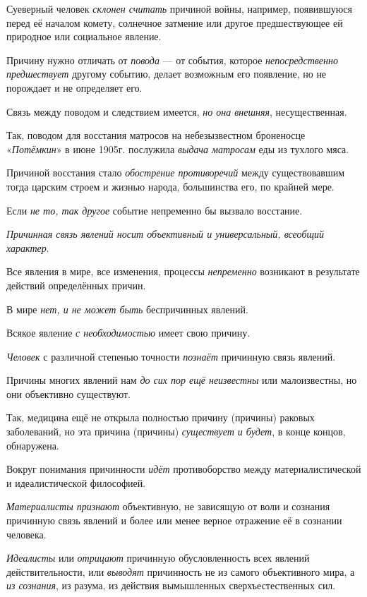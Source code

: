 \documentclass[a4paper,14pt,russian]{extreport}
\begin{document}
Суеверный человек \emph{склонен считать} причиной войны, например, появившуюся перед её началом комету, солнечное затмение или другое предшествующее ей природное или социальное явление.

Причину нужно отличать от \emph{повода} --- от события, которое \emph{непосредственно предшествует} другому событию, делает возможным его появление, но не порождает и не определяет его.

Связь между поводом и следствием имеется, \emph{но она внешняя}, несущественная.

Так, поводом для восстания матросов на небезызвестном броненосце «\emph{Потёмкин}» в июне 1905г. послужила \emph{выдача матросам} еды из тухлого мяса.

Причиной восстания стало \emph{обострение противоречий} между существовавшим тогда царским строем и жизнью народа, большинства его, по крайней мере.

Если \emph{не то, так другое} событие непременно бы вызвало восстание.

\emph{Причинная связь явлений носит объективный и универсальный, всеобщий характер}.

Все явления в мире, все изменения, процессы \emph{непременно} возникают в результате действий определённых причин.

В мире \emph{нет, и не может быть} беспричинных явлений.

Всякое явление \emph{с необходимостью} имеет свою причину.

\emph{Человек} с различной степенью точности \emph{познаёт} причинную связь явлений.

Причины многих явлений нам \emph{до сих пор ещё неизвестны} или малоизвестны, но они объективно существуют.

Так, медицина ещё не открыла полностью причину (причины) раковых заболеваний, но эта причина (причины) \emph{существует и будет}, в конце концов, обнаружена.

Вокруг понимания причинности \emph{идёт} противоборство между материалистической и идеалистической философией.

\emph{Материалисты признают} объективную, не зависящую от воли и сознания причинную связь явлений и более или менее верное отражение её в сознании человека.

\emph{Идеалисты} или \emph{отрицают} причинную обусловленность всех явлений действительности, или \emph{выводят} причинность не из самого объективного мира, а \emph{из сознания}, из разума, из действия вымышленных сверхъестественных сил.
\end{document}
